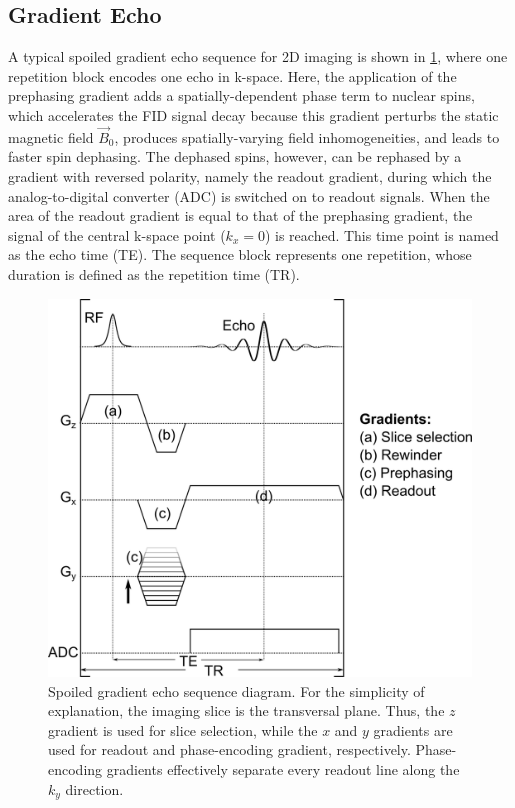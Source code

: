 \subsection{Gradient Echo}
A typical spoiled gradient echo sequence for 2D imaging is shown in \cref{Fig:mri-seq-ge-cart}, where one repetition block encodes one echo in k-space. Here, the application of the prephasing gradient adds a spatially-dependent phase term to nuclear spins, which accelerates the FID signal decay because this gradient perturbs the static magnetic field $\vec{B}_0$, produces spatially-varying field inhomogeneities, and leads to faster spin dephasing. The dephased spins, however, can be rephased by a gradient with reversed polarity, namely the readout gradient, during which the analog-to-digital converter (ADC) is switched on to readout signals. When the area of the readout gradient is equal to that of the prephasing gradient, the signal of the central k-space point ($k_x = 0$) is reached. This time point is named as the echo time (\acs{TE}). The sequence block represents one repetition, whose duration is defined as the repetition time (\acs{TR}).
\begin{figure}[tb]
  \centering
  \includegraphics[scale=1]{fig/mri-seq-ge-cart.png}
  \caption{Spoiled gradient echo sequence diagram. For the simplicity of explanation, the imaging slice is the transversal plane. Thus, the $z$ gradient is used for slice selection, while the $x$ and $y$ gradients are used for readout and phase-encoding gradient, respectively. Phase-encoding gradients effectively separate every readout line along the $k_y$ direction.} \label{Fig:mri-seq-ge-cart}
\end{figure}

